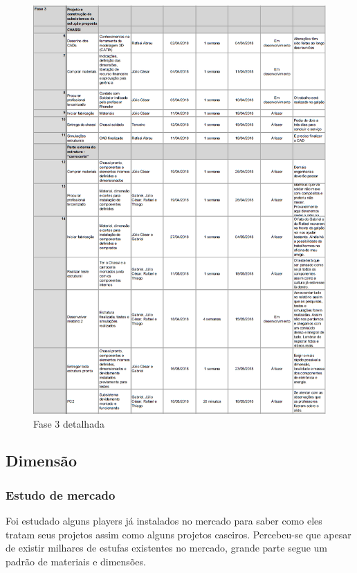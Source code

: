 \begin{figure}[H]
	\centering
	\includegraphics[width=17cm]{figuras/fase_3.png}
	\caption{Fase 3 detalhada} 
	\label{fase_3}
\end{figure}

\subsection{Dimensão}

\subsubsection{Estudo de mercado}

Foi estudado alguns players já instalados no mercado para saber como eles tratam seus projetos assim como alguns projetos caseiros. Percebeu-se que apesar de existir milhares de estufas existentes no mercado, grande parte segue um padrão de materiais e dimensões.

